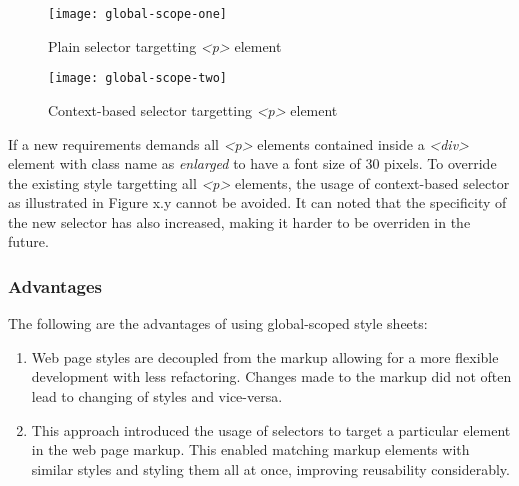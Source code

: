\documentclass[12pt]{article}
\begin{document}
\vspace{0.5cm}

\begin{figure}[h]
\texttt{[image: global-scope-one]}
\centering
\caption{Plain selector targetting \textit{<p>} element}
\end{figure}

\vspace{0.5cm}

\begin{figure}[h]
\texttt{[image: global-scope-two]}
\centering
\caption{Context-based selector targetting \textit{<p>} element}
\end{figure}

\vspace{0.5cm}

If a new requirements demands all \textit{<p>} elements contained inside a \textit{<div>} element with class name as \textit{enlarged} to have a font size of 30 pixels. To override the existing style targetting all \textit{<p>} elements, the usage of  context-based selector as illustrated in Figure x.y cannot be avoided. It can noted that the specificity of the new selector has also increased, making it harder to be overriden in the future. 


\subsubsection{Advantages}
The following are the advantages of using global-scoped style sheets:
\begin{enumerate}
	\item Web page styles are decoupled from the markup allowing for a more flexible development with less refactoring. Changes made to the markup did not often lead to changing of styles and vice-versa.

	\item This approach introduced the usage of selectors to target a particular element in the web page markup. This enabled matching markup elements with similar styles and styling them all at once, improving reusability considerably.
\end{enumerate} 
\end{document}
